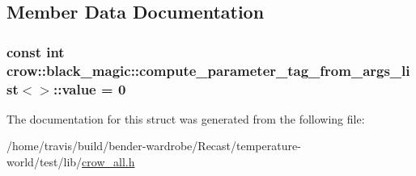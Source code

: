 \subsection{Member Data Documentation}
\hypertarget{structcrow_1_1black__magic_1_1compute__parameter__tag__from__args__list_3_4_a45883ca903d54772d967f8ad7ac86324}{
\subsubsection[{value}]{\setlength{\rightskip}{0pt plus 5cm}const int {\bf crow\-::black\-\_\-magic\-::compute\-\_\-parameter\-\_\-tag\-\_\-from\-\_\-args\-\_\-list}$<$$>$\-::value = 0\hspace{0.3cm}{\ttfamily [static]}}}\label{structcrow_1_1black__magic_1_1compute__parameter__tag__from__args__list_3_4_a45883ca903d54772d967f8ad7ac86324}


The documentation for this struct was generated from the following file\-:\begin{DoxyCompactItemize}
\item 
/home/travis/build/bender-\/wardrobe/\-Recast/temperature-\/world/test/lib/\hyperlink{crow__all_8h}{crow\-\_\-all.\-h}\end{DoxyCompactItemize}

